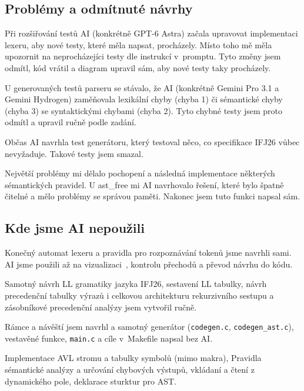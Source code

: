 \subsection{Problémy a odmítnuté návrhy}
\begin{description}[style=nextline]
  \item[Tadeáš Zonyga]
    Při rozšiřování testů AI (konkrétně GPT-6 Astra) začala upravovat
    implementaci lexeru, aby nové testy, které měla napsat, procházely.
    Místo toho mě měla upozornit na neprocházejíci testy dle instrukcí
    v~promptu. Tyto změny jsem odmítl, kód vrátil a diagram upravil sám,
    aby nové testy taky procházely.
  \item[Dušan Popović] U generovaných testů parseru se stávalo, že AI (konkrétně Gemini Pro 3.1 a Gemini Hydrogen) zaměňovala lexikální chyby (chyba 1) či sémantické chyby (chyba 3) se syntaktickými chybami (chyba 2). Tyto chybné testy jsem proto odmítl a upravil ručně podle zadání.
  \item[Marek Záchenský]
    Občas AI navrhla test generátoru, který testoval něco, co specifikace
    IFJ26 vůbec nevyžaduje. Takové testy jsem smazal.
  \item[Adam Zatloukal]
  Největší problémy mi dělalo pochopení a následná implementace některých sémantických pravidel. U ast\_free
  mi AI navrhovalo řešení, které bylo špatně čitelné a mělo problémy se správou paměti. Nakonec jsem tuto funkci
  napsal sám.

\end{description}

\subsection{Kde jsme AI nepoužili}
\begin{description}[style=nextline]
  \item[Tadeáš Zonyga]
    Konečný automat lexeru a pravidla pro rozpoznávání tokenů jsme navrhli
    sami. AI jsme použili až na vizualizaci~\cite{ifj26vizualizace},
    kontrolu přechodů a převod návrhu do kódu.
  \item[Dušan Popović] Samotný návrh LL gramatiky jazyka IFJ26, sestavení LL tabulky, návrh precedenční tabulky výrazů i celkovou architekturu rekurzivního sestupu a zásobníkové precedenční analýzy jsem vytvořil ručně.
  \item[Marek Záchenský]
    Rámce a návěští jsem navrhl a samotný generátor (\texttt{codegen.c},
    \texttt{codegen\_ast.c}), vestavěné funkce, \texttt{main.c} a cíle
    v~Makefile napsal bez AI.
  \item[Adam Zatloukal]
    Implementace AVL stromu a tabulky symbolů (mimo makra), Pravidla sémantické analýzy
    a určování chybových výstupů, vkládaní a čtení z dynamického pole, deklarace sturktur pro AST.
\end{description}
